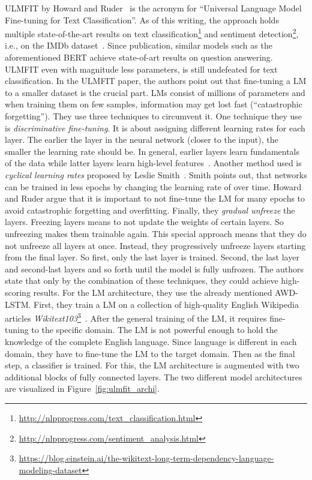 ULMFIT by Howard and Ruder~\cite{howard2018universal} is the acronym for ``Universal Language Model Fine-tuning for Text Classification''. As of this writing, the approach holds multiple state-of-the-art results on text classification\footnote{\url{http://nlpprogress.com/text_classification.html}} and sentiment detection\footnote{\url{http://nlpprogress.com/sentiment_analysis.html}}, i.e., on the IMDb dataset~\cite{maas2011learning}. Since publication, similar models such as the aforementioned BERT achieve state-of-art results on question answering. ULMFIT even with magnitude less parameters, is still undefeated for text classification.
In the ULMFIT paper, the authors point out that fine-tuning a LM to a smaller dataset is the crucial part.
LMs consist of millions of parameters and when training them on few samples, information may get lost fast (``catastrophic forgetting'').
 They use three techniques to circumvent it.
One technique they use is \textit{discriminative fine-tuning}.
It is about assigning different learning rates for each layer.
The earlier the layer in the neural network (closer to the input), the smaller the learning rate should be. In general, earlier layers learn fundamentals of the data while latter layers learn high-level features~\cite{Yosinski:2014:TFD:2969033.2969197}.
Another method used is \textit{cyclical learning rates} proposed by Leslie Smith~\cite{smith2017cyclical}.
Smith points out, that networks can be trained in less epochs by changing the learning rate of over time.
 Howard and Ruder argue that it is important to not fine-tune the LM for many epochs to avoid catastrophic forgetting and overfitting.
 Finally, they \textit{gradual unfreeze} the layers.
 Freezing layers means to not update the weights of certain layers.
 So unfreezing makes them trainable again.
 This special approach means that they do not unfreeze all layers at once.
 Instead, they progressively unfreeze layers starting from the final layer. So first, only the last layer is trained.
 Second, the last layer and second-last layers and so forth until the model is fully unfrozen.
 The authors state that only by the combination of these techniques, they could achieve high-scoring results.
 For the LM architecture, they use the already mentioned AWD-LSTM.
  First, they train a LM on a collection of high-quality English Wikipedia articles \textit{Wikitext103}\footnote{\url{https://blog.einstein.ai/the-wikitext-long-term-dependency-language-modeling-dataset}}~\cite{wikitext103}.
 After the general training of the LM, it requires fine-tuning to the specific domain.
 The LM is not powerful enough to hold the knowledge of the complete English language.
 Since language is different in each domain, they have to fine-tune the LM to the target domain.
 Then as the final step, a classifier is trained. For this, the LM architecture is augmented with two additional blocks of fully connected layers. The two different model architectures are visualized in Figure~\ref{fig:ulmfit_archi}.

